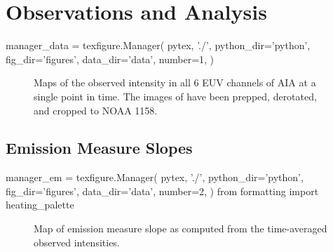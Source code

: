 \section{Observations and Analysis}\label{observations}

\begin{pycode}
manager_data = texfigure.Manager(
    pytex, './',
    python_dir='python',
    fig_dir='figures',
    data_dir='data',
    number=1,
)
\end{pycode}


\begin{figure*}
    \caption{Maps of the observed intensity in all 6 EUV channels of AIA at a single point in time. The images of have been prepped, derotated, and cropped to \AR{} NOAA 1158.}
    \label{fig:intensity_maps}
\end{figure*}


\subsection{Emission Measure Slopes}\label{em_slopes}

\begin{pycode}[manager_em]
manager_em = texfigure.Manager(
    pytex, './',
    python_dir='python',
    fig_dir='figures',
    data_dir='data',
    number=2,
)
from formatting import heating_palette
\end{pycode}


\begin{figure}
    \caption{Map of emission measure slope as computed from the time-averaged observed intensities.}
    \label{fig:em_slope_map}
\end{figure}


